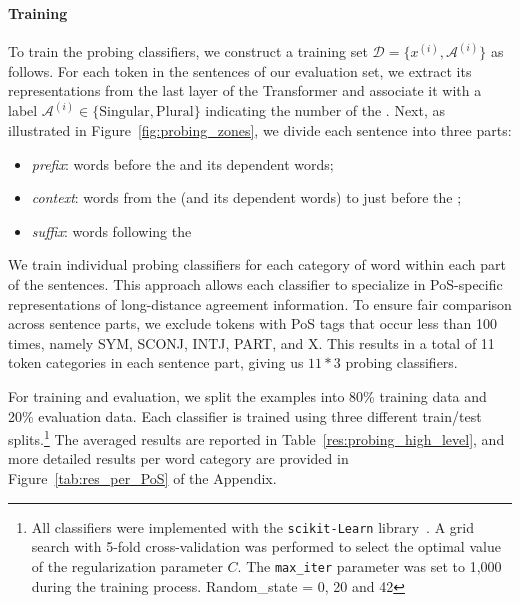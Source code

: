 \paragraph{Training} To train the probing classifiers, we construct a training set $\mathcal{D} = \{x^{(i)}, \mathcal{A}^{(i)}\}$ as follows. For each token in the sentences of our evaluation set, we extract its representations from the last layer of the Transformer and associate it with a label $\mathcal{A}^{(i)} \in \{ \textrm{Singular}, \textrm{Plural} \}$ indicating the number of the \cue. Next, as illustrated in Figure~\ref{fig:probing_zones}, we divide each sentence into three parts: 
\begin{itemize}[topsep=0pt,itemsep=-1ex,partopsep=1ex,parsep=1ex]
    \item \emph{prefix}: words before the \cue and its dependent words;
    \item \emph{context}: words from the \cue (and its dependent words) to just before the \target;
    \item \emph{suffix}: words following the \target
\end{itemize}
\noindent We train individual probing classifiers for each category of word within each part of the sentences. This approach allows each classifier to specialize in PoS-specific representations of long-distance agreement information. To ensure fair comparison across sentence parts, we exclude tokens with PoS tags that occur less than 100 times, namely SYM, SCONJ, INTJ, PART, and X. This results in a total of 11 token categories in each sentence part, giving us $11*3$ probing classifiers.

For training and evaluation, we split the examples into 80\% training data and 20\% evaluation data. Each classifier is trained using three different train/test splits.\footnote{All classifiers were implemented with the \texttt{scikit-Learn} library~\cite{scikit-learn}. A grid search with 5-fold cross-validation was performed to select the optimal value of the regularization parameter $C$. The \texttt{max\_iter} parameter was set to 1,000 during the training process. Random\_state = 0, 20 and 42} The averaged results are reported in Table~\ref{res:probing_high_level}, and more detailed results per word category are provided in Figure~\ref{tab:res_per_PoS} of the Appendix.

